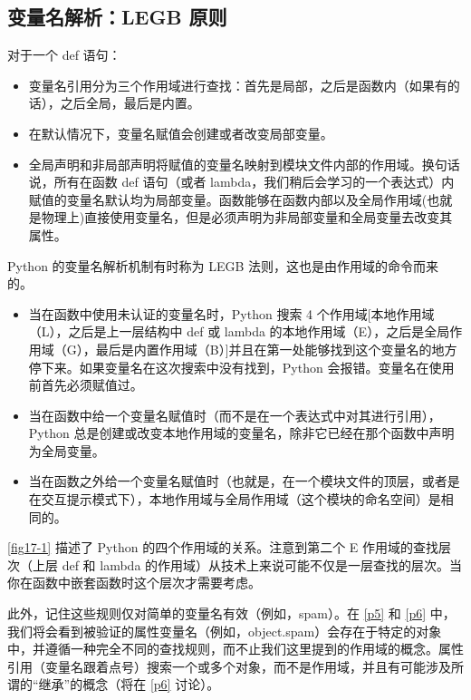 \subsection{变量名解析：LEGB 原则}
对于一个 def 语句：
\begin{itemize}
    \item 变量名引用分为三个作用域进行查找：首先是局部，之后是函数内（如果有的话），之后全局，最后是内置。
    \item 在默认情况下，变量名赋值会创建或者改变局部变量。
    \item 全局声明和非局部声明将赋值的变量名映射到模块文件内部的作用域。换句话说，所有在函数 def 语句（或者 lambda，我们稍后会学习的一个表达式）内赋值的变量名默认均为局部变量。函数能够在函数内部以及全局作用域(也就是物理上)直接使用变量名，但是必须声明为非局部变量和全局变量去改变其属性。
\end{itemize}

Python 的变量名解析机制有时称为 LEGB 法则，这也是由作用域的命令而来的。
\begin{itemize}
    \item 当在函数中使用未认证的变量名时，Python 搜索 4 个作用域[本地作用域（L），之后是上一层结构中 def 或 lambda 的本地作用域（E），之后是全局作用域（G），最后是内置作用域（B）]并且在第一处能够找到这个变量名的地方停下来。如果变量名在这次搜索中没有找到，Python 会报错。变量名在使用前首先必须赋值过。
    \item 当在函数中给一个变量名赋值时（而不是在一个表达式中对其进行引用），Python 总是创建或改变本地作用域的变量名，除非它已经在那个函数中声明为全局变量。
    \item 当在函数之外给一个变量名赋值时（也就是，在一个模块文件的顶层，或者是在交互提示模式下），本地作用域与全局作用域（这个模块的命名空间）是相同的。
\end{itemize}

\autoref{fig17-1} 描述了 Python 的四个作用域的关系。注意到第二个 E 作用域的查找层次（上层 def 和 lambda 的作用域）从技术上来说可能不仅是一层查找的层次。当你在函数中嵌套函数时这个层次才需要考虑。


此外，记住这些规则仅对简单的变量名有效（例如，spam）。在 \autoref{p5} 和 \autoref{p6} 中，我们将会看到被验证的属性变量名（例如，object.spam）会存在于特定的对象中，并遵循一种完全不同的查找规则，而不止我们这里提到的作用域的概念。属性引用（变量名跟着点号）搜索一个或多个对象，而不是作用域，并且有可能涉及所谓的“继承”的概念（将在 \autoref{p6} 讨论）。
